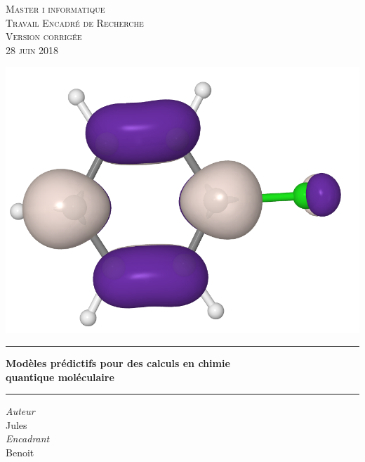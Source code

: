 \documentclass{report}
\begin{document}
\begin{titlepage}
	\centering
	
    \vspace*{0.7 cm}
    
   	\textsc{\LARGE Master i informatique\\Travail Encadré de Recherche\\[0.3cm]\large  Version corrigée\\[0.15cm]28 juin 2018}

	\vspace*{1.5cm}
    
	\includegraphics[scale=0.20]{images/iso_niveaux.png}

	\vspace*{0.5cm}

    
	\rule{\linewidth }{0.2 mm} 
    {\LARGE \textbf{Modèles prédictifs pour des calculs en chimie\\ quantique moléculaire}}
	\rule{\linewidth}{0.2 mm}
	\begin{flushleft}
\end{flushleft}

    
	
	\begin{center}
	\vspace{0.3cm}
	
	\emph{Auteur}\\
	\vspace{0.1cm}
	Jules \\ 
	
	
	\vspace{0.5cm}
	\emph{Encadrant}\\
	\vspace{0.1cm}
	Benoit \\
	

\end{center}
\end{titlepage}
\end{document}
